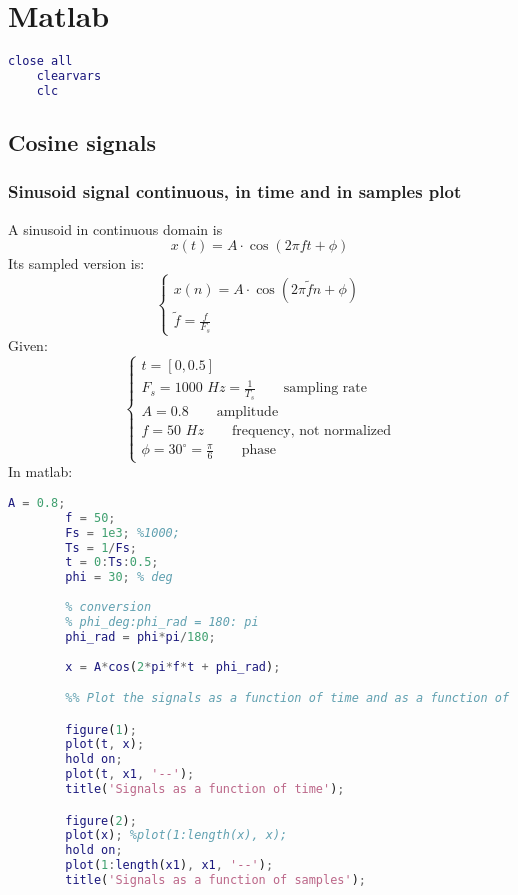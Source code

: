 
\section{Matlab}

\begin{lstlisting}[language=Matlab, escapeinside=`']
    close all
    clearvars
    clc
\end{lstlisting}

\subsection{Cosine signals}

    \subsubsection{Sinusoid signal continuous, in time and in samples plot}
    A sinusoid in continuous domain is
    $$
    x(t)=A\cdot\cos(2\pi ft+\phi)
    $$
    Its sampled version is:
    $$
    \begin{cases}
        x(n)=A\cdot\cos(2\pi \tilde{f}n+\phi)\\
        \tilde{f}=\frac{f}{F_s}
    \end{cases}
    $$
    Given:
    $$
    \begin{cases}
        t=[0,0.5]\\
        F_s=1000\,\,Hz=\frac{1}{T_s}\qquad\text{sampling rate}\\
        A=0.8\qquad\text{amplitude}\\
        f=50\,\,Hz\qquad\text{frequency, not normalized}\\
        \phi=30^\circ=\frac{\pi}{6}\qquad\text{phase}
    \end{cases}
    $$
    In matlab:
    \begin{lstlisting}[language=Matlab, escapeinside=`']
        A = 0.8;
        f = 50;
        Fs = 1e3; %1000;
        Ts = 1/Fs;
        t = 0:Ts:0.5;
        phi = 30; % deg
        
        % conversion
        % phi_deg:phi_rad = 180: pi
        phi_rad = phi*pi/180;
        
        x = A*cos(2*pi*f*t + phi_rad);

        %% Plot the signals as a function of time and as a function of samples

        figure(1);
        plot(t, x);
        hold on;
        plot(t, x1, '--');
        title('Signals as a function of time');

        figure(2);
        plot(x); %plot(1:length(x), x);
        hold on;
        plot(1:length(x1), x1, '--');
        title('Signals as a function of samples');

    \end{lstlisting}

